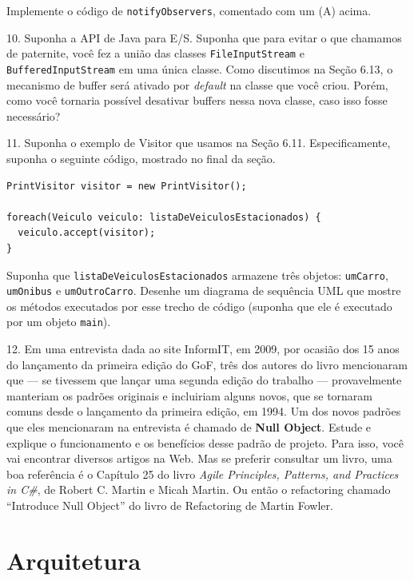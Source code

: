 \documentclass[
  11pt,
  twoside]{book}
\newcommand{\passthrough}[1]{#1}
\begin{document}
Implemente o código de \passthrough{\lstinline!notifyObservers!},
comentado com um (A) acima.

10. Suponha a API de Java para E/S. Suponha que para evitar o que
chamamos de paternite, você fez a união das classes
\passthrough{\lstinline!FileInputStream!} e
\passthrough{\lstinline!BufferedInputStream!} em uma única classe. Como
discutimos na Seção 6.13, o mecanismo de buffer será ativado por
\emph{default} na classe que você criou. Porém, como você tornaria
possível desativar buffers nessa nova classe, caso isso fosse
necessário?

11. Suponha o exemplo de Visitor que usamos na Seção 6.11.
Especificamente, suponha o seguinte código, mostrado no final da seção.

\begin{lstlisting}
PrintVisitor visitor = new PrintVisitor();

foreach(Veiculo veiculo: listaDeVeiculosEstacionados) {
  veiculo.accept(visitor);
}
\end{lstlisting}

Suponha que \passthrough{\lstinline!listaDeVeiculosEstacionados!}
armazene três objetos: \passthrough{\lstinline!umCarro!},
\passthrough{\lstinline!umOnibus!} e
\passthrough{\lstinline!umOutroCarro!}. Desenhe um diagrama de sequência
UML que mostre os métodos executados por esse trecho de código (suponha
que ele é executado por um objeto \passthrough{\lstinline!main!}).

 

12. Em uma entrevista dada ao site InformIT, em 2009, por ocasião dos 15
anos do lançamento da primeira edição do GoF, três dos autores do livro
mencionaram que --- se tivessem que lançar uma segunda edição do
trabalho --- provavelmente manteriam os padrões originais e incluiriam
alguns novos, que se tornaram comuns desde o lançamento da primeira
edição, em 1994. Um dos novos padrões que eles mencionaram na entrevista
é chamado de \textbf{Null Object}. Estude e explique o funcionamento e
os benefícios desse padrão de projeto. Para isso, você vai encontrar
diversos artigos na Web. Mas se preferir consultar um livro, uma boa
referência é o Capítulo 25 do livro \emph{Agile Principles, Patterns,
and Practices in C\#}, de Robert C. Martin e Micah Martin. Ou então o
refactoring chamado ``Introduce Null Object'' do livro de Refactoring de
Martin Fowler.

\hypertarget{arquitetura}{%
\chapter{Arquitetura}\label{arquitetura}}
\end{document}
